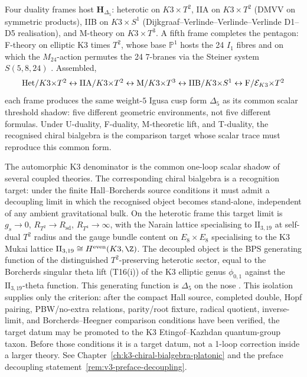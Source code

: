 \begin{remark}
\label{rem:v3-intro-five-frames}
Four duality frames host $\mathbf{H}_{\Delta_5}$: heterotic on
$K3\times T^2$, IIA on $K3\times T^2$ (DMVV on symmetric products),
IIB on $K3\times S^1$ (Dijkgraaf--Verlinde--Verlinde--Verlinde D1--D5
realisation), and M-theory on $K3\times T^3$. A fifth frame completes
the pentagon: F-theory on elliptic K3 times $T^2$, whose base
$\mathbb{P}^1$ hosts the 24 $I_1$ fibres and on which the $M_{24}$-action
permutes the 24 7-branes via the Steiner system $S(5,8,24)$
\cite{Vafa1996,MorrisonVafa1996II,NahmWendland2001,TaorminaWendland2011}.
Assembled,
\[
 \begin{array}{c@{\;\leftrightarrow\;}c@{\;\leftrightarrow\;}c@{\;\leftrightarrow\;}c@{\;\leftrightarrow\;}c}
 \text{Het}/K3{\times}T^2
 & \text{IIA}/K3{\times}T^2
 & \text{M}/K3{\times}T^3
 & \text{IIB}/K3{\times}S^1
 & \text{F}/\mathcal{E}_{K3}{\times}T^2
 \end{array}
\]
each frame produces the same weight-$5$ Igusa cusp form $\Delta_5$
as its common scalar threshold shadow: five different geometric
environments, not five different formulas. Under U-duality, F-duality,
M-theoretic lift, and T-duality, the recognised chiral bialgebra is the
comparison target whose scalar trace must reproduce this common form.
\end{remark}

\begin{remark}
\label{rem:v3-intro-decoupling}
\label{rem:v3-preface-decoupling}
The automorphic K3 denominator is the common one-loop scalar shadow of
several coupled theories. The corresponding chiral bialgebra is a
recognition target:
under the finite Hall--Borcherds source conditions it must admit a
decoupling limit in which the recognised object becomes stand-alone,
independent of any ambient gravitational bulk. On the heterotic frame
this target limit is
$g_s\to 0$, $R_{T^2}\to R_{\mathrm{sd}}$, $R_{T^4}\to\infty$, with the
Narain lattice specialising to $\mathrm{II}_{3,19}$ at self-dual $T^2$
radius and the gauge bundle content on $E_8\times E_8$ specialising to
the K3 Mukai lattice
$\mathrm{II}_{3,19}\cong H^{\mathrm{even}}(K3,\Z)$. The decoupled
object is the BPS generating function of the distinguished
$T^2$-preserving heterotic sector, equal to the Borcherds singular
theta lift (T16(i)) of the K3 elliptic genus $\phi_{0,1}$ against
the $\mathrm{II}_{3,19}$-theta
function. This generating function is $\Delta_5$ on the nose
\cite{HarveyMoore1996,Borcherds1998,Sen2007}. This isolation supplies
only the criterion: after the compact Hall source, completed double, Hopf
pairing, PBW/no-extra relations, parity/root fixture, radical quotient,
inverse-limit, and Borcherds--Heegner comparison conditions have been
verified, the target datum may be promoted to the K3
Etingof--Kazhdan quantum-group taxon. Before those conditions it is a
target datum, not a 1-loop correction inside a larger
theory.
See Chapter~\ref{ch:k3-chiral-bialgebra-platonic} and the preface
decoupling statement~\ref{rem:v3-preface-decoupling}.
\end{remark}

